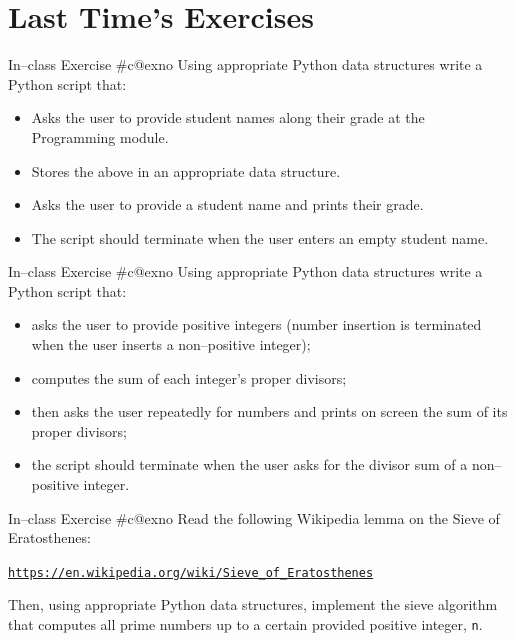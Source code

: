 \documentclass[aspectratio=169, 12pt, xcolor=table]{beamer}
\makeatletter
\newcommand{\ohref}[1]{\href{#1}{\texttt{#1}}}
\newcommand{\arabicthree}[1]{\expandafter\@arabicthree\csname c@#1\endcsname}
\newcommand{\@arabicthree}[1]{\ifnum #1<100 0\fi\ifnum #1<10 0\fi\number#1}
\newcounter{exno}
\newcommand{\exno}{\stepcounter{exno}In--class Exercise \#\arabicthree{exno}}
\makeatother
\begin{document}
	\section{Last Time's Exercises}\label{sec:last-time-s-exercises}
	
	\sectionframe
	
	\setcounter{exno}{0}
	
	
	\begin{frame}{\exno}
		Using appropriate Python data structures write a Python script that:
		\begin{itemize}
			\item Asks the user to provide student names along their grade at the Programming module.
			\item Stores the above in an appropriate data structure.
			\item Asks the user to provide a student name and prints their grade.
			\item The script should terminate when the user enters an empty student name.
		\end{itemize}
	\end{frame}
	
	\begin{frame}{\exno}
		Using appropriate Python data structures write a Python script that:
		\begin{itemize}
			\item asks the user to provide positive integers (number insertion is terminated when the user inserts a non--positive integer);
			\item computes the sum of each integer's proper divisors;
			\item then asks the user repeatedly for numbers and prints on screen the sum of its proper divisors;
			\item the script should terminate when the user asks for the divisor sum of a non--positive integer.
		\end{itemize}
	\end{frame}
	
	\begin{frame}{\exno}
		Read the following Wikipedia lemma on the Sieve of Eratosthenes:
		\begin{center}
			\ohref{https://en.wikipedia.org/wiki/Sieve\_of\_Eratosthenes}
		\end{center}
		Then, using appropriate Python data structures, implement the sieve algorithm that computes all prime numbers up to a certain provided positive integer, \texttt{n}.
	\end{frame}
	
\end{document}
